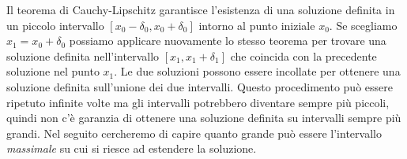 Il teorema di Cauchy-Lipschitz garantisce l'esistenza di una soluzione
definita in un
piccolo intervallo $[x_0-\delta_0, x_0+\delta_0]$ intorno al punto iniziale $x_0$.
Se scegliamo $x_1 = x_0+\delta_0$ possiamo applicare nuovamente lo stesso
teorema per trovare una soluzione definita nell'intervallo
$[x_1, x_1+\delta_1]$
che coincida con la precedente soluzione nel punto $x_1$.
Le due soluzioni possono
essere incollate per ottenere una soluzione definita sull'unione dei due intervalli.
Questo procedimento può essere ripetuto infinite volte ma gli intervalli
potrebbero diventare sempre più piccoli, quindi non c'è garanzia di ottenere una
soluzione definita su intervalli sempre più grandi.
Nel seguito cercheremo di capire quanto grande può essere l'intervallo
\emph{massimale} su cui si riesce ad estendere la soluzione.


